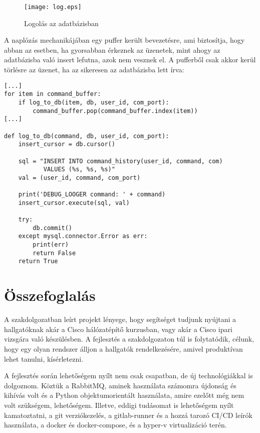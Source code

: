 \documentclass[12pt]{report}
\begin{document}
\begin{figure}[h]
    \centering
    \texttt{[image: log.eps]}
    \caption{Logolás az adatbázisban}
\end{figure}

A naplózás mechanikájában egy puffer került bevezetésre, ami biztosítja, hogy abban az esetben, ha gyorsabban érkeznek az üzenetek, mint ahogy az adatbázisba való insert lefutna, azok nem vesznek el. A pufferből csak akkor kerül törlésre az üzenet, ha az sikeresen az adatbázisba lett írva:

\begin{verbatim}
[...]
for item in command_buffer:
    if log_to_db(item, db, user_id, com_port):
        command_buffer.pop(command_buffer.index(item))
[...]

def log_to_db(command, db, user_id, com_port):
    insert_cursor = db.cursor()

    sql = "INSERT INTO command_history(user_id, command, com) 
           VALUES (%s, %s, %s)"
    val = (user_id, command, com_port)

    print('DEBUG_LOOGER command: ' + command)
    insert_cursor.execute(sql, val)

    try:
        db.commit()
    except mysql.connector.Error as err:
        print(err)
        return False
    return True
\end{verbatim}

\newpage

\section{Összefoglalás}

A szakdolgozatban leírt projekt lényege, hogy segítséget tudjunk nyújtani a hallgatóknak akár a Cisco hálózatépítő kurzusban, vagy akár a Cisco ipari vizsgára való készülésben. A fejlesztés a szakdolgozaton túl is folytatódik, célunk, hogy egy olyan rendszer álljon a hallgatók rendelkezésére, amivel produktívan lehet tanulni, kísérletezni.


A fejlesztés során lehetőségem nyílt nem csak csapatban, de új technológiákkal is dolgoznom. Köztük a RabbitMQ, aminek használata számomra újdonság és kihívás volt és a Python objektumorientált használata, amire ezelőtt még nem volt szükségem, lehetőségem. Illetve, eddigi tudásomat is lehetőségem nyílt kamatoztatni, a git verziókezelés, a gitlab-runner és a hozzá tarozó CI/CD leírók használata, a docker és docker-compose, és a hyper-v virtualizáció terén.
\end{document}
